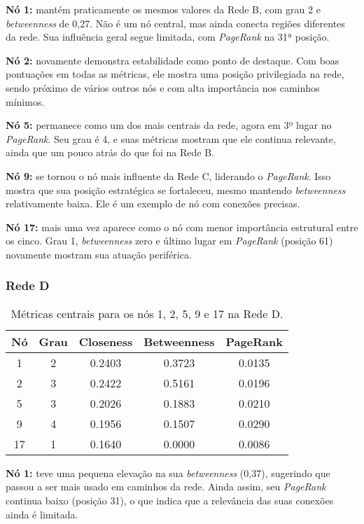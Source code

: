 \documentclass[a4paper]{article}
\begin{document}
\textbf{Nó 1:} mantém praticamente os mesmos valores da Rede B, com grau 2 e \textit{betweenness} de 0{,}27. Não é um nó central, mas ainda conecta regiões diferentes da rede. Sua influência geral segue limitada, com \textit{PageRank} na 31ª posição.

\textbf{Nó 2:} novamente demonstra estabilidade como ponto de destaque. Com boas pontuações em todas as métricas, ele mostra uma posição privilegiada na rede, sendo próximo de vários outros nós e com alta importância nos caminhos mínimos.

\textbf{Nó 5:} permanece como um dos mais centrais da rede, agora em 3º lugar no \textit{PageRank}. Seu grau é 4, e suas métricas mostram que ele continua relevante, ainda que um pouco atrás do que foi na Rede B.

\textbf{Nó 9:} se tornou o nó mais influente da Rede C, liderando o \textit{PageRank}. Isso mostra que sua posição estratégica se fortaleceu, mesmo mantendo \textit{betweenness} relativamente baixa. Ele é um exemplo de nó com conexões precisas.

\textbf{Nó 17:} mais uma vez aparece como o nó com menor importância estrutural entre os cinco. Grau 1, \textit{betweenness} zero e último lugar em \textit{PageRank} (posição 61) novamente mostram sua atuação periférica.


\subsubsection{Rede D}

\begin{table}[h]
\centering
\begin{tabular}{|c|c|c|c|c|}
\hline
\textbf{Nó} & \textbf{Grau} & \textbf{Closeness} & \textbf{Betweenness} & \textbf{PageRank} \\
\hline
1  & 2 & 0.2403 & 0.3723 & 0.0135 \\
2  & 3 & 0.2422 & 0.5161 & 0.0196 \\
5  & 3 & 0.2026 & 0.1883 & 0.0210 \\
9  & 4 & 0.1956 & 0.1507 & 0.0290 \\
17 & 1 & 0.1640 & 0.0000 & 0.0086 \\
\hline
\end{tabular}
\caption{Métricas centrais para os nós 1, 2, 5, 9 e 17 na Rede D.}
\end{table}

\textbf{Nó 1:} teve uma pequena elevação na sua \textit{betweenness} (0{,}37), sugerindo que passou a ser mais usado em caminhos da rede. Ainda assim, seu \textit{PageRank} continua baixo (posição 31), o que indica que a relevância das suas conexões ainda é limitada.
\end{document}
